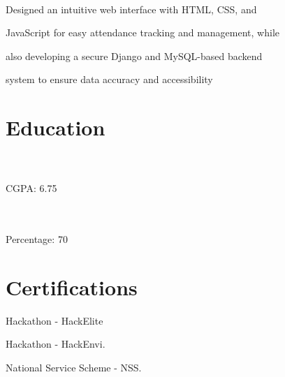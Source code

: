 \documentclass[]{deedy-resume-openfont}
\begin{document}
            \sectionsep
        
             \hfill {}\\
            \begin{tightemize}
\item  Designed an intuitive web interface with HTML, CSS, and
\item[] JavaScript for easy attendance tracking and management, while
\item[] also developing a secure Django and MySQL-based backend
\item[] system to ensure data accuracy and accessibility
\end{tightemize}

%
%
\section{Education}
\raggedright
    \hspace*{\fill}  \\
    \hspace*{\fill}\\
    CGPA: 6.75\\
    \sectionsep
    
     \hspace*{\fill}  \\
    \hspace*{\fill}\\
    Percentage: 70%
    \sectionsep

%
%
\section{Certifications}
\vspace{4pt}
\begin{tightemize}
\item Hackathon - HackElite\\
\item Hackathon - HackEnvi.\\
\item National Service Scheme - NSS.\\
\end{tightemize}
\vspace{4pt}

      \ 
      
\end{document}
